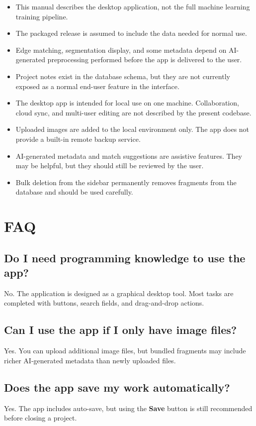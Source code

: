 \documentclass[12pt]{article}
\begin{document}
\begin{itemize}
  \item This manual describes the desktop application, not the full machine learning training pipeline.
  \item The packaged release is assumed to include the data needed for normal use.
  \item Edge matching, segmentation display, and some metadata depend on AI-generated preprocessing performed before the app is delivered to the user.
  \item Project notes exist in the database schema, but they are not currently exposed as a normal end-user feature in the interface.
  \item The desktop app is intended for local use on one machine. Collaboration, cloud sync, and multi-user editing are not described by the present codebase.
  \item Uploaded images are added to the local environment only. The app does not provide a built-in remote backup service.
  \item AI-generated metadata and match suggestions are assistive features. They may be helpful, but they should still be reviewed by the user.
  \item Bulk deletion from the sidebar permanently removes fragments from the database and should be used carefully.
\end{itemize}

\section{FAQ}

\subsection{Do I need programming knowledge to use the app?}
No. The application is designed as a graphical desktop tool. Most tasks are completed with buttons, search fields, and drag-and-drop actions.

\subsection{Can I use the app if I only have image files?}
Yes. You can upload additional image files, but bundled fragments may include richer AI-generated metadata than newly uploaded files.

\subsection{Does the app save my work automatically?}
Yes. The app includes auto-save, but using the \textbf{Save} button is still recommended before closing a project.
\end{document}
